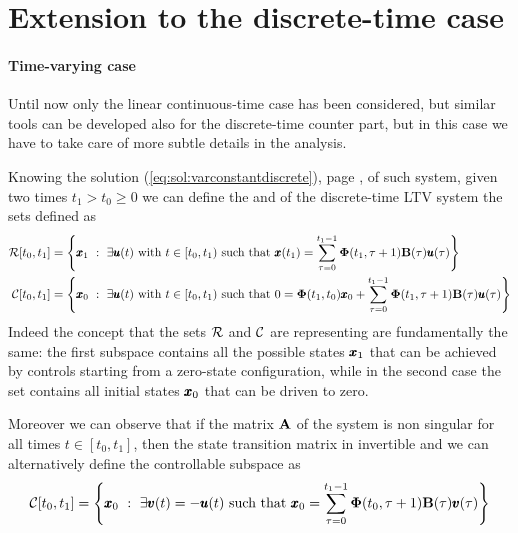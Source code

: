 \section{Extension to the discrete-time case}
	\paragraph{Time-varying case} Until now only the linear continuous-time case has been considered, but similar tools can be developed also for the discrete-time counter part, but in this case we have to take care of more subtle details in the analysis.
	
	Knowing the solution (\ref{eq:sol:varconstantdiscrete}), page \pageref{eq:sol:varconstantdiscrete}, of such system, given two times $t_1 > t_0 \geq 0$ we can define the  and  of the discrete-time LTV system the sets defined as
	\begin{equation}
	\begin{split}
		\mathcal R[t_0,t_1] & = \left\{ \pmb{x}_1 \ : \ \exists \pmb{u}(t) \textrm{ with } t \in [t_0,t_1) \textrm{ such that } \pmb{x}(t_1) = \sum_{\tau = 0}^{t_1-1} \mathbf{\Phi}(t_1,\tau + 1) \mathbf{B}(\tau)\pmb{u}(\tau) \right\} \\
		\mathcal C[t_0,t_1] & = \left\{ \pmb{x}_0 \ : \ \exists \pmb{u}(t) \textrm{ with } t \in [t_0,t_1) \textrm{ such that } 0 = \mathbf{\Phi}(t_1,t_0)\pmb{x}_0 + \sum_{\tau = 0}^{t_1-1} \mathbf{\Phi}(t_1,\tau + 1) \mathbf{B}(\tau)\pmb{u}(\tau) \right\} 
	\end{split}
	\end{equation}
	Indeed the concept that the sets $\mathcal R$ and $\mathcal C$ are representing are fundamentally the same: the first subspace contains all the possible states $\pmb{x}_1$ that can be achieved by controls starting from a zero-state configuration, while in the second case the set contains all initial states $\pmb{x}_0$ that can be driven to zero.
	
	Moreover we can observe that if the matrix $\mathbf{A}$ of the system is non singular for all times $t\in[t_0,t_1]$, then the state transition matrix in invertible and we can alternatively define the controllable subspace as
	\[ \mathcal C[t_0,t_1] = \left\{ \pmb{x}_0 \ : \ \exists \pmb{v}(t) = -\pmb{u}(t) \textrm{ such that } \pmb{x}_0 = \sum_{\tau = 0}^{t_1-1} \mathbf{\Phi}(t_0,\tau+1) \mathbf{B}(\tau) \pmb{v}(\tau) \right\} \]	
	
